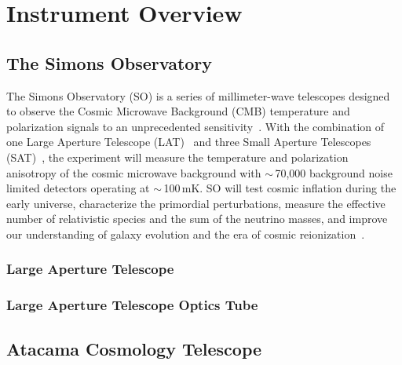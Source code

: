 \chapter{Instrument Overview}

\section{The Simons Observatory}

The Simons Observatory (SO) is a series of millimeter-wave telescopes designed to observe the Cosmic Microwave Background (CMB) temperature and polarization signals to an unprecedented sensitivity~\cite{gali18, so19}. With the combination of one Large Aperture Telescope (LAT)~\cite{xu/etal:2020c, zhu18, orlo18, coppi/etal:2018} and three Small Aperture Telescopes (SAT)~\cite{ali20}, the experiment will measure the temperature and polarization anisotropy of the cosmic microwave background with $\sim$\,70,000 background noise limited detectors operating at $\sim$\,100\,mK. SO will test cosmic inflation during the early universe, characterize the primordial perturbations, measure the effective number of relativistic species and the sum of the neutrino masses, and improve our understanding of galaxy evolution and the era of cosmic reionization~\citep{so19}. 

\subsection{Large Aperture Telescope}
\subsection{Large Aperture Telescope Optics Tube}

\section{Atacama Cosmology Telescope}
